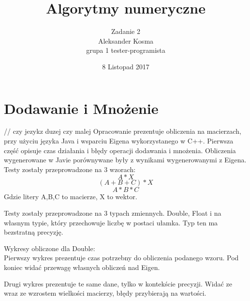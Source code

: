 \documentclass[10pt]{article}
\title{Algorytmy numeryczne}
\author{Zadanie 2 \\ Aleksander Kosma\\grupa 1 tester-programista}
\date{8 Listopad 2017}
\begin{document}
\maketitle 

\section{Dodawanie i Mnożenie}
// czy jezykz duzej czy malej
Opracowanie prezentuje obliczenia na macierzach, przy użyciu języka Java i wsparciu Eigena 
wykorzystanego w C++.
Pierwsza część opisuje czas działania i błędy operacji dodawania i mnożenia.
Obliczenia wygenerowane w Javie porównywane były z wynikami wygenerowanymi z Eigena.
Testy zostały przeprowadzone na 3 wzorach:
$$A * X$$
$$(A+B+C)*X$$
$$A*B*C$$
Gdzie litery A,B,C to macierze, X to wektor.

Testy zostały przeprowadzone na 3 typach zmiennych. Double, Float i na własnym typie, który przechowuje
liczbę w postaci ułamka. Typ ten ma bezstratną precyzję.


Wykresy obliczone dla Double:\\

Pierwszy wykres prezentuje czas potrzebny do obliczenia podanego wzoru. Pod koniec widać przewagę własnych obliczeń nad Eigen.
\begin{center}
\end{center}

Drugi wykres prezentuje te same dane, tylko w kontekście precyzji. Widać ze wraz ze wzrostem wielkości macierzy, błędy przybierają na wartości.
\begin{center}
\end{center}
\end{document}
